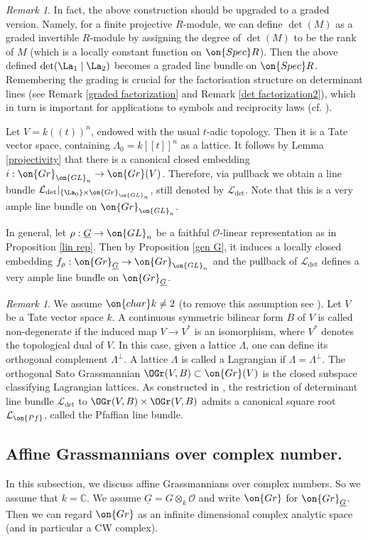 \documentclass[]{pcmi}
\theoremstyle{plain}
\theoremstyle{remark}
\newtheorem{rmk}[equation]{Remark}
\theoremstyle{definition}
\newcommand{\bC}{{\mathbb C}}
\newcommand{\mL}{{\mathcal L}}
\newcommand{\mO}{{\mathcal O}}
\newcommand{\Gr}{{\on{Gr}}}
\newcommand{\Spec}{\on{Spec}}
\newcommand{\GL}{{\on{GL}}}
\begin{document}
\begin{rmk}\label{graded line}
In fact, the above construction should be upgraded to a graded version. Namely, for a finite projective $R$-module, we can define $\det(M)$ as a graded invertible $R$-module by assigning the degree of $\det(M)$ to be the rank of $M$ (which is a locally constant function on $\Spec R$). Then the above defined $\det(\La_1\mid\La_2)$ becomes a graded line bundle on $\Spec R$.
Remembering the grading is crucial for the factorisation structure on determinant lines (see Remark \ref{graded factorization} and Remark \ref{det factorization2}), which in turn is important for applications to symbols and reciprocity laws (cf. \cite{BBE, OZ1, OZ2}). 
\end{rmk}


Let $V=k((t))^n$, endowed with the usual $t$-adic topology. Then it is a Tate vector space, containing $\Lambda_0=k[[t]]^n$ as a lattice. It follows by Lemma \ref{projectivity} that  there is a canonical closed embedding $i:\Gr_{\GL_{n}}\to\Gr(V)$.
Therefore, via pullback we obtain a line bundle $\mL_{\det}|_{\{\La_0\}\times\Gr_{\GL_n}}$, still denoted by $\mL_{\det}$. Note that this is a very ample line bundle on $\Gr_{\GL_n}$. 


In general, let $\rho: \underline G\to \GL_n$ be a faithful $\mO$-linear representation as in Proposition \ref{lin rep}. Then
by Proposition \ref{gen G}, it induces a locally closed embedding
$f_\rho: \Gr_{\underline G}\to \Gr_{\GL_n}$ and the pullback of $\mL_{\det}$ defines a very ample line bundle on $\Gr_{\underline G}$.


\begin{rmk}\label{Pfaffians}
We assume $\on{char} k\neq 2$  (to remove this assumption see \cite[\S\ 4.2.16]{BD}). 
Let $V$ be a Tate vector space $k$. A continuous symmetric bilinear form $B$ of $V$ is called non-degenerate if the induced map $V\to V^*$ is an isomorphism, where $V^*$ denotes the topological dual of $V$. In this case, given a lattice $\Lambda$, one can define its orthogonal complement $\Lambda^\perp$. A lattice $\Lambda$ is called a Lagrangian if $\Lambda=\Lambda^\perp$. 
The orthogonal Sato Grassmannian $\OGr(V,B)\subset \Gr(V)$ is the closed subspace classifying Lagrangian lattices. As constructed in \cite[\S\ 4]{BD}, the restriction of determinant line bundle $\mL_{\det}$ to $\OGr(V,B)\times \OGr(V,B)$ admits a canonical square root $\mL_{\on{Pf}}$, called the Pfaffian line bundle.
\end{rmk}

\subsection{Affine Grassmannians over complex number.}\label{top loop group}
In this subsection, we discuss affine Grassmannians over complex numbers. So we assume that $k=\bC$. We assume $\underline G=G\otimes_k \mO$ and write $\Gr$ for $\Gr_{\underline G}$. Then we can regard $\Gr$ as an infinite dimensional complex analytic space (and in particular a CW complex). 
\end{document}
